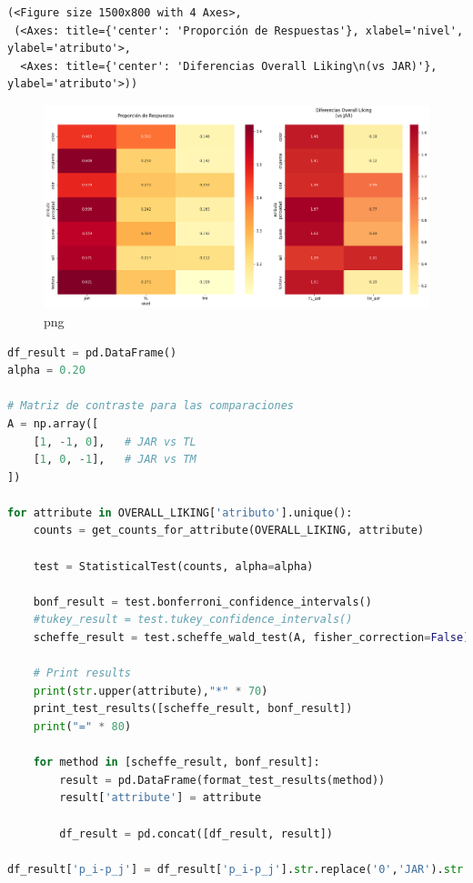 \begin{lstlisting}
(<Figure size 1500x800 with 4 Axes>,
 (<Axes: title={'center': 'Proporción de Respuestas'}, xlabel='nivel', ylabel='atributo'>,
  <Axes: title={'center': 'Diferencias Overall Liking\n(vs JAR)'}, ylabel='atributo'>))
\end{lstlisting}

\begin{figure}
\centering
\includegraphics{implementation_files/implementation_9_1.png}
\caption{png}
\end{figure}

\begin{lstlisting}[language=Python]
df_result = pd.DataFrame()
alpha = 0.20

# Matriz de contraste para las comparaciones
A = np.array([
    [1, -1, 0],   # JAR vs TL
    [1, 0, -1],   # JAR vs TM
])

for attribute in OVERALL_LIKING['atributo'].unique():
    counts = get_counts_for_attribute(OVERALL_LIKING, attribute)

    test = StatisticalTest(counts, alpha=alpha)

    bonf_result = test.bonferroni_confidence_intervals()
    #tukey_result = test.tukey_confidence_intervals()
    scheffe_result = test.scheffe_wald_test(A, fisher_correction=False)

    # Print results 
    print(str.upper(attribute),"*" * 70)
    print_test_results([scheffe_result, bonf_result])
    print("=" * 80)

    for method in [scheffe_result, bonf_result]:
        result = pd.DataFrame(format_test_results(method))
        result['attribute'] = attribute
        
        df_result = pd.concat([df_result, result]) 

df_result['p_i-p_j'] = df_result['p_i-p_j'].str.replace('0','JAR').str.replace('1','TL').str.replace('2','TM')
\end{lstlisting}

